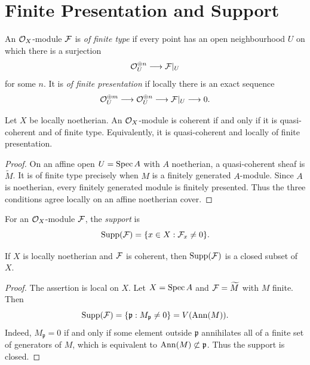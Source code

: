 \section{Finite Presentation and Support}

\begin{definition}
An \(\mathcal{O}_X\)-module \(\mathcal{F}\) is \emph{of finite type} if every point has an open
neighbourhood \(U\) on which there is a surjection
\[
    \mathcal{O}_U^{\oplus n}\longrightarrow \mathcal{F}|_U
\]
for some \(n\).  It is \emph{of finite presentation} if locally there is an
exact sequence
\[
    \mathcal{O}_U^{\oplus m}\longrightarrow \mathcal{O}_U^{\oplus n}
    \longrightarrow \mathcal{F}|_U\longrightarrow0.
\]
\end{definition}

\begin{proposition}
Let \(X\) be locally noetherian.  An \(\mathcal{O}_X\)-module is coherent if and only
if it is quasi-coherent and of finite type.  Equivalently, it is
quasi-coherent and locally of finite presentation.
\end{proposition}

\begin{proof}
On an affine open \(U=\operatorname{Spec} A\) with \(A\) noetherian, a quasi-coherent sheaf is
\(\widetilde M\).  It is of finite type precisely when \(M\) is a finitely
generated \(A\)-module.  Since \(A\) is noetherian, every finitely generated
module is finitely presented.  Thus the three conditions agree locally on an
affine noetherian cover.
\end{proof}

\begin{definition}
For an \(\mathcal{O}_X\)-module \(\mathcal{F}\), the \emph{support} is
\[
    \operatorname{Supp}(\mathcal{F})=\{x\in X:\mathcal{F}_x\ne0\}.
\]
\end{definition}

\begin{proposition}
If \(X\) is locally noetherian and \(\mathcal{F}\) is coherent, then \(\operatorname{Supp}(\mathcal{F})\) is a
closed subset of \(X\).
\end{proposition}

\begin{proof}
The assertion is local on \(X\).  Let \(X=\operatorname{Spec} A\) and \(\mathcal{F}=\widetilde M\)
with \(M\) finite.  Then
\[
    \operatorname{Supp}(\mathcal{F})=\{\mathfrak p:M_{\mathfrak p}\ne0\}=V(\operatorname{Ann}(M)).
\]
Indeed, \(M_{\mathfrak p}=0\) if and only if some element outside
\(\mathfrak p\) annihilates all of a finite set of generators of \(M\), which is
equivalent to \(\operatorname{Ann}(M)\not\subset\mathfrak p\).  Thus the support is closed.
\end{proof}

